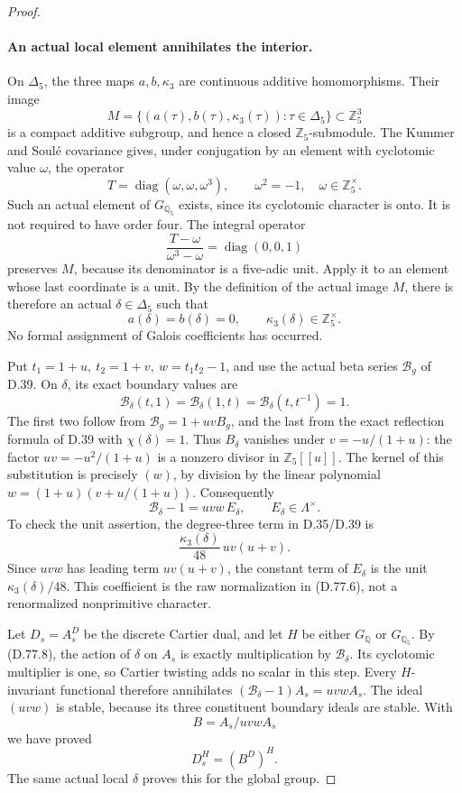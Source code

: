 \begin{proof}
\paragraph{An actual local element annihilates the interior.}
On \(\Delta_5\), the three maps \(a,b,\kappa_3\) are continuous
additive homomorphisms. Their image
\[
 M=\{(a(\tau),b(\tau),\kappa_3(\tau)):\tau\in\Delta_5\}
       \subset\mathbb Z_5^3
\]
is a compact additive subgroup, and hence a closed
\(\mathbb Z_5\)-submodule. The Kummer and Soul\'e covariance gives,
under conjugation by an element with cyclotomic value \(\omega\),
the operator
\[
 T=\operatorname{diag}(\omega,\omega,\omega^3),
 \qquad \omega^2=-1,\quad\omega\in\mathbb Z_5^\times.
\]
Such an actual element of \(G_{\mathbb Q_5}\) exists, since its
cyclotomic character is onto. It is not required to have order four.
The integral operator
\[
 \frac{T-\omega}{\omega^3-\omega}
             =\operatorname{diag}(0,0,1)                \tag{D.77.7}
\]
preserves \(M\), because its denominator is a five-adic unit.
Apply it to an element whose last coordinate is a unit.
By the definition of the actual image \(M\), there is therefore
an actual \(\delta\in\Delta_5\) such that
\[
 a(\delta)=b(\delta)=0,\qquad \kappa_3(\delta)\in\mathbb Z_5^\times .
                                                               \tag{D.77.8}
\]
No formal assignment of Galois coefficients has occurred.

Put \(t_1=1+u,\ t_2=1+v,\ w=t_1t_2-1\), and use the actual beta
series \(\mathcal B_g\) of D.39. On \(\delta\), its exact boundary
values are
\[
 \mathcal B_\delta(t,1)=\mathcal B_\delta(1,t)
          =\mathcal B_\delta(t,t^{-1})=1.
\]
The first two follow from \(\mathcal B_g=1+uvB_g\), and the last
from the exact reflection formula of D.39 with \(\chi(\delta)=1\).
Thus \(B_\delta\) vanishes under \(v=-u/(1+u)\): the factor
\(uv=-u^2/(1+u)\) is a nonzero divisor in \(\mathbb Z_5[[u]]\).
The kernel of this substitution is precisely \((w)\), by division
by the linear polynomial
\(w=(1+u)(v+u/(1+u))\). Consequently
\[
 \mathcal B_\delta-1=uvw\,E_\delta,\qquad
                E_\delta\in\Lambda^\times.             \tag{D.77.9}
\]
To check the unit assertion, the degree-three term in D.35/D.39 is
\[
 \frac{\kappa_3(\delta)}{48}\,uv(u+v).
 \]
Since \(uvw\) has leading term \(uv(u+v)\), the constant term of
\(E_\delta\) is the unit \(\kappa_3(\delta)/48\).
This coefficient is the raw normalization in (D.77.6), not a
renormalized nonprimitive character.

Let \(D_s=A_s^D\) be the discrete Cartier dual, and let
\(H\) be either \(G_{\mathbb Q}\) or \(G_{\mathbb Q_5}\).
By (D.77.8), the action of \(\delta\) on \(A_s\) is exactly
multiplication by \(\mathcal B_\delta\). Its cyclotomic multiplier
is one, so Cartier twisting adds no scalar in this step.
Every \(H\)-invariant functional therefore annihilates
\((\mathcal B_\delta-1)A_s=uvwA_s\). The ideal \((uvw)\)
is stable, because its three constituent boundary ideals are stable.
With
\[
                         B=A_s/uvwA_s
\]
we have proved
\[
                         D_s^H=(B^D)^H.                \tag{D.77.10}
\]
The same actual local \(\delta\) proves this for the global group.


\end{proof}
